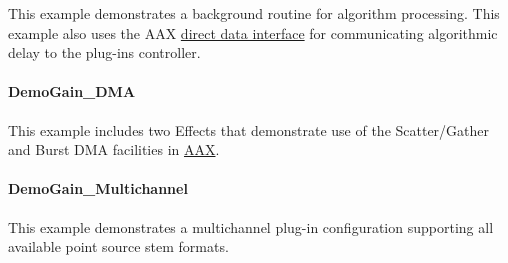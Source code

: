 This example demonstrates a background routine for algorithm processing. This example also uses the A\+A\+X \hyperlink{a00333}{direct data interface} for communicating algorithmic delay to the plug-\/in\textquotesingle{}s controller.\hypertarget{a00376_DemoGain_DMA}{}\paragraph{Demo\+Gain\+\_\+\+D\+M\+A}\label{a00376_DemoGain_DMA}
This example includes two Effects that demonstrate use of the Scatter/\+Gather and Burst D\+M\+A facilities in \hyperlink{a00288}{A\+A\+X}.\hypertarget{a00376_DemoGain_Multichannel}{}\paragraph{Demo\+Gain\+\_\+\+Multichannel}\label{a00376_DemoGain_Multichannel}
This example demonstrates a multichannel plug-\/in configuration supporting all available point source stem formats.


